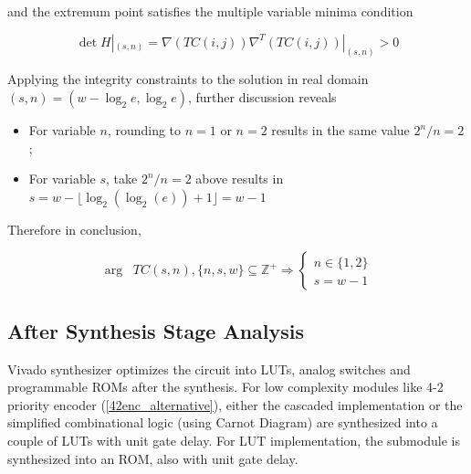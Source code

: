 \documentclass[journal, onecolumn]{IEEEtran}
\begin{document}
and the extremum point satisfies the multiple variable minima condition

\begin{equation}
  \det H|_{(s,n)}=\nabla (TC(i,j)) \nabla^{T} (TC(i,j))|_{(s,n)} > 0
\end{equation}

Applying the integrity constraints to the solution in real domain \((s,n) = (w-\log_2 e, \log_2 e)\), further discussion reveals

\begin{itemize}
  \item For variable \(n\), rounding to \(n=1\) or \(n=2\) results in the same value \(2^{n}/n=2\);
  \item For variable \(s\), take \(2^{n}/n=2\) above results in \(s=w-\lfloor \log_2(\log_2(e))+1 \rfloor = w-1\)
\end{itemize}

Therefore in conclusion,

\begin{equation}
  \mathop{\mathrm{arg}\ \min_{(s,n)}}\ TC(s,n), \{n,s,w\}\subseteq \mathbb{Z^{+}} \Rightarrow
  \begin{cases}
    n\in\{1,2\}\\
    s=w-1
  \end{cases}
\end{equation}

\subsection{After Synthesis Stage Analysis}

Vivado synthesizer optimizes the circuit into LUTs, analog switches and programmable ROMs after the synthesis. For low complexity modules like 4-2 priority encoder (\ref{42enc_alternative}), either the cascaded implementation or the simplified combinational logic (using Carnot Diagram) are synthesized into a couple of LUTs with unit gate delay. For LUT implementation, the submodule is synthesized into an ROM, also with unit gate delay.
\end{document}
